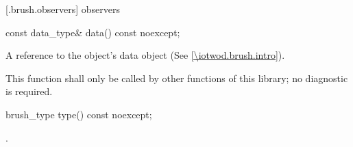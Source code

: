  [\iotwod.brush.observers]{ observers}

\begin{itemdecl}
const data_type& data() const noexcept;
\end{itemdecl}
\begin{itemdescr}
\pnum
\returns
A reference to the  object's data object (See \ref{\iotwod.brush.intro}).

\pnum
\remarks
This function shall only be called by other functions of this library; no diagnostic is required.
\end{itemdescr}

%
\begin{itemdecl}
brush_type type() const noexcept;
\end{itemdecl}
\begin{itemdescr}
\pnum
\returns
{}.
\end{itemdescr}

